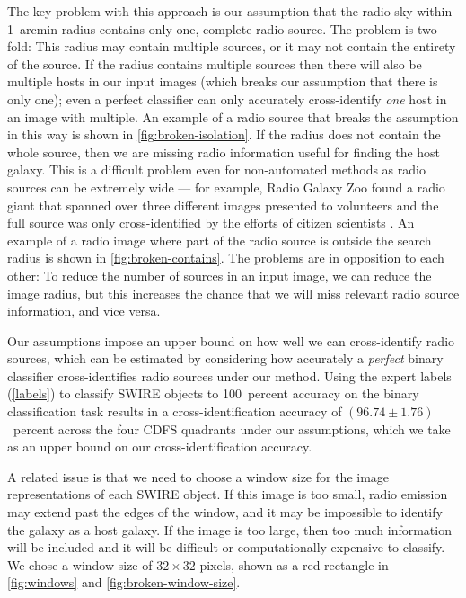 \documentclass[fleqn,usenatbib,usedcolumn]{mnras}
\begin{document}
     The key problem with this approach is our assumption that the radio sky
    within 1~arcmin radius contains only one, complete radio source. The problem
    is two-fold: This radius may contain multiple sources, or it may not contain
    the entirety of the source. If the radius contains multiple sources then
    there will also be multiple hosts in our input images (which breaks our
    assumption that there is only one); even a perfect classifier can only
    accurately cross-identify \emph{one} host in an image with multiple. An
    example of a radio source that breaks the assumption in this way is shown in
    \autoref{fig:broken-isolation}. If the radius does not contain the whole
    source, then we are missing radio information useful for finding the host
    galaxy. This is a difficult problem even for non-automated methods as radio
    sources can be extremely wide --- for example, Radio Galaxy Zoo found a
    radio giant that spanned over three different images presented to volunteers
    and the full source was only cross-identified by the efforts of citizen
    scientists \citep{banfield15}. An example of a radio image where part of the
    radio source is outside the search radius is shown in
    \autoref{fig:broken-contains}. The problems are in opposition to each other:
    To reduce the number of sources in an input image, we can reduce the image
    radius, but this increases the chance that we will miss relevant radio
    source information, and vice versa.

    Our assumptions impose an upper bound on how well we can cross-identify
    radio sources, which can be estimated by considering how accurately a
    \emph{perfect} binary classifier cross-identifies radio sources under our
    method. Using the expert labels (\autoref{labels}) to classify SWIRE objects
    to 100~percent accuracy on the binary classification task results in a
    cross-identification accuracy of $(96.74 \pm 1.76)$~percent across the four
    CDFS quadrants under our assumptions, which we take as an upper bound on our
    cross-identification accuracy.

    A related issue is that we need to choose a window size for the image
    representations of each SWIRE object. If this image is too small, radio
    emission may extend past the edges of the window, and it may be impossible
    to identify the galaxy as a host galaxy. If the image is too large, then
    too much information will be included and it will be difficult or
    computationally expensive to classify. We chose a window size of $32
    \times 32$ pixels, shown as a red rectangle in
    \autoref{fig:windows} and \autoref{fig:broken-window-size}.
\end{document}
